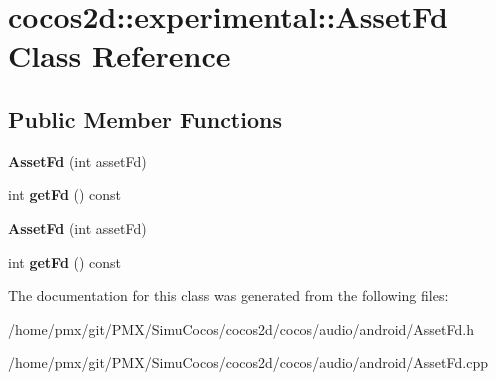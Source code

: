 \hypertarget{classcocos2d_1_1experimental_1_1AssetFd}{}\section{cocos2d\+:\+:experimental\+:\+:Asset\+Fd Class Reference}
\label{classcocos2d_1_1experimental_1_1AssetFd}
\subsection*{Public Member Functions}
\begin{DoxyCompactItemize}
\item 
\mbox{\label{classcocos2d_1_1experimental_1_1AssetFd_aaf0730482610d56474126044cc6f9a67}} 
{\bfseries Asset\+Fd} (int asset\+Fd)
\item 
\mbox{\label{classcocos2d_1_1experimental_1_1AssetFd_affd3dda4328feab61eb6a8acbba5c499}} 
int {\bfseries get\+Fd} () const
\item 
\mbox{\label{classcocos2d_1_1experimental_1_1AssetFd_aaf0730482610d56474126044cc6f9a67}} 
{\bfseries Asset\+Fd} (int asset\+Fd)
\item 
\mbox{\label{classcocos2d_1_1experimental_1_1AssetFd_affd3dda4328feab61eb6a8acbba5c499}} 
int {\bfseries get\+Fd} () const
\end{DoxyCompactItemize}


The documentation for this class was generated from the following files\+:\begin{DoxyCompactItemize}
\item 
/home/pmx/git/\+P\+M\+X/\+Simu\+Cocos/cocos2d/cocos/audio/android/Asset\+Fd.\+h\item 
/home/pmx/git/\+P\+M\+X/\+Simu\+Cocos/cocos2d/cocos/audio/android/Asset\+Fd.\+cpp\end{DoxyCompactItemize}
